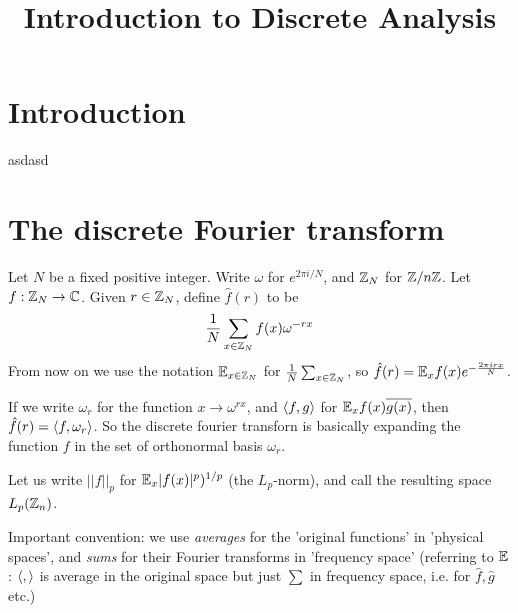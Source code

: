 \documentclass[a4paper]{article}
\begin{document}
\title{Introduction to Discrete Analysis}

\maketitle

\newpage

\tableofcontents

\newpage

\section{Introduction}
asdasd

\newpage

\section{The discrete Fourier transform}

Let $N$ be a fixed positive integer. Write $\omega$ for $e^{2\pi i/N}$, and $\mathbb{Z}_N$ for $\mathbb{Z}/n\mathbb{Z}$. Let $f:\mathbb{Z}_N \to \mathbb{C}$. Given $r \in \mathbb{Z}_N$, define $\hat{f}(r)$ to be
\begin{equation*}
\begin{aligned}
\frac{1}{N} \sum_{x \in \mathbb{Z}_N} f(x) \omega^{-rx}
\end{aligned}
\end{equation*}
From now on we use the notation $\mathbb{E}_{x \in \mathbb{Z}_N}$ for $\frac{1}{N}\sum_{x \in \mathbb{Z}_N}$, so $\hat{f}(r) = \mathbb{E}_x f(x) e^{-\frac{2\pi irx}{N}}$.

If we write $\omega_r$ for the function $x \to \omega^{rx}$, and $\langle f,g\rangle$ for $\mathbb{E}_x f(x) \overline{g(x)}$, then $\hat{f}(r) = \langle f,\omega_r \rangle$. So the discrete fourier transforn is basically expanding the function $f$ in the set of orthonormal basis $\omega_r$.

Let us write $||f||_p$ for $\mathbb{E}_x |f(x)|^p)^{1/p}$ (the $L_p$-norm), and call the resulting space $L_p(\mathbb{Z}_n)$.

Important convention: we use \emph{averages} for the 'original functions' in 'physical spaces', and \emph{sums} for their Fourier transforms in 'frequency space' (referring to $\mathbb{E}$: $\langle,\rangle$ is average in the original space but just $\sum$ in frequency space, i.e. for $\hat{f},\hat{g}$ etc.)
\end{document}
